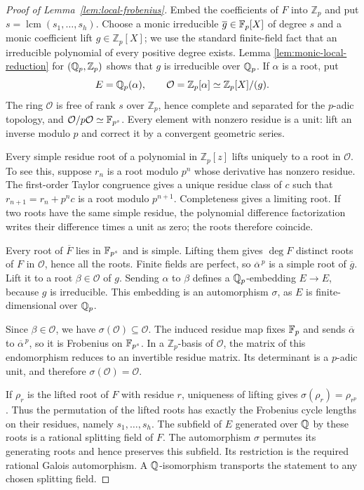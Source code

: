 \begin{proof}[Proof of Lemma~\ref{lem:local-frobenius}]
Embed the coefficients of $F$ into $\mathbb Z_p$ and put
$s=\operatorname{lcm}(s_1,\ldots,s_h)$.  Choose a monic irreducible
$\overline g\in\mathbb F_p[X]$ of degree $s$ and a monic coefficient lift
$g\in\mathbb Z_p[X]$; we use the standard finite-field fact that an
irreducible polynomial of every positive degree exists.  Lemma
\ref{lem:monic-local-reduction} for $(\mathbb Q_p,\mathbb Z_p)$ shows that $g$
is irreducible over $\mathbb Q_p$.  If $\alpha$ is a root, put
\[
 E=\mathbb Q_p(\alpha),\qquad
 \mathcal O=\mathbb Z_p[\alpha]\simeq\mathbb Z_p[X]/(g).
\]
The ring $\mathcal O$ is free of rank $s$ over $\mathbb Z_p$, hence
complete and separated for the $p$-adic topology, and
$\mathcal O/p\mathcal O\simeq\mathbb F_{p^s}$.  Every element with nonzero
residue is a unit: lift an inverse modulo $p$ and correct it by a
convergent geometric series.

Every simple residue root of a polynomial in $\mathbb Z_p[z]$ lifts
uniquely to a root in $\mathcal O$.  To see this, suppose $r_n$ is a
root modulo $p^n$ whose derivative has nonzero residue.  The first-order
Taylor congruence gives a unique residue class of $c$ such that
$r_{n+1}=r_n+p^nc$ is a root modulo $p^{n+1}$.  Completeness gives a
limiting root.  If two roots have the same simple residue, the polynomial
difference factorization writes their difference times a unit as zero;
the roots therefore coincide.

Every root of $\overline F$ lies in $\mathbb F_{p^s}$ and is simple.  Lifting
them gives $\deg F$ distinct roots of $F$ in $\mathcal O$, hence all
the roots.  Finite fields are perfect, so $\overline\alpha^{\,p}$ is a
simple root of $\overline g$.  Lift it to a root $\beta\in\mathcal O$ of
$g$.  Sending $\alpha$ to $\beta$ defines a $\mathbb Q_p$-embedding $E\to E$,
because $g$ is irreducible.  This embedding is an automorphism $\sigma$,
as $E$ is finite-dimensional over $\mathbb Q_p$.

Since $\beta\in\mathcal O$, we have $\sigma(\mathcal O)\subseteq\mathcal O$.
The induced residue map fixes $\mathbb F_p$ and sends $\overline\alpha$ to
$\overline\alpha^{\,p}$, so it is Frobenius on $\mathbb F_{p^s}$.  In a
$\mathbb Z_p$-basis of $\mathcal O$, the matrix of this endomorphism
reduces to an invertible residue matrix.  Its determinant is a $p$-adic
unit, and therefore $\sigma(\mathcal O)=\mathcal O$.

If $\rho_r$ is the lifted root of $F$ with residue $r$, uniqueness of
lifting gives $\sigma(\rho_r)=\rho_{r^p}$.  Thus the permutation of the
lifted roots has exactly the Frobenius cycle lengths on their residues,
namely $s_1,\ldots,s_h$.  The subfield of $E$ generated over $\mathbb Q$ by
these roots is a rational splitting field of $F$.  The automorphism
$\sigma$ permutes its generating roots and hence preserves this subfield.
Its restriction is the required rational Galois automorphism.  A
$\mathbb Q$-isomorphism transports the statement to any chosen splitting field.
\end{proof}
